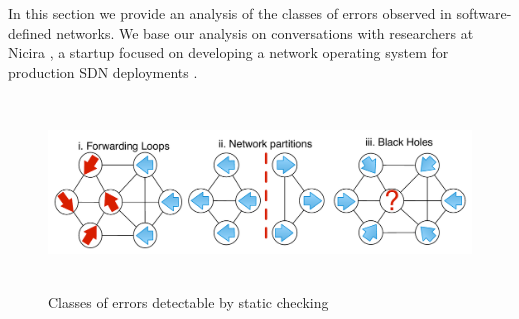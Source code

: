 
In this section we provide an analysis of the classes of errors observed in
software-defined networks. We base our analysis on conversations with
researchers at Nicira \cite{Nicira}, a startup focused on developing a network operating
system for production SDN deployments \cite{Onix}.

\begin{figure}[t]
    \centering
    \includegraphics[height=2in,width=6in]{../diagrams/bugs/basic_invariants.pdf}
    \caption[]{\label{fig:loop} Classes of errors detectable by static
    checking\vspace{-10pt}} 
\end{figure}


